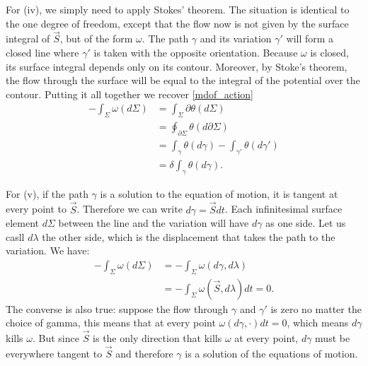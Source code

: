 \documentclass[10pt,twocolumn, nofootinbib]{revtex4-2}
\begin{document}
For (iv), we simply need to apply Stokes' theorem. The situation is identical to the one degree of freedom, except that the flow now is not given by the surface integral of $\vec{S}$, but of the form $\omega$. The path $\gamma$ and its variation $\gamma'$ will form a closed line where $\gamma'$ is taken with the opposite orientation. Because $\omega$ is closed, its surface integral depends only on its contour. Moreover, by Stoke's theorem, the flow through the surface will be equal to the integral of the potential over the contour. Putting it all together we recover \ref{mdof_action}
\begin{equation}
\begin{aligned}
	- \int_{\Sigma} \omega(d\Sigma) &=
	\int_{\Sigma} \partial \theta (d\Sigma) \\
	&= \oint_{\partial \Sigma} \theta(d\partial\Sigma) \\
	&= \int_{\gamma} \theta(d\gamma) - \int_{\gamma'} \theta (d\gamma') \\
	&= \delta \int_{\gamma} \theta (d\gamma).
\end{aligned}
\end{equation}

For (v), if the path $\gamma$ is a solution to the equation of motion, it is tangent at every point to $\vec{S}$. Therefore we can write $d\gamma= \vec{S} dt$. Each infinitesimal surface element $d\Sigma$ between the line and the variation will have $d\gamma$ as one side. Let us casll $d\lambda$ the other side, which is the displacement that takes the path to the variation. We have:
\begin{equation}
\begin{aligned}
	-\int_\Sigma \omega(d\Sigma) &= -\int_\Sigma \omega(d\gamma, d\lambda) \\
	&= -\int_\Sigma \omega(\vec{S}, d\lambda) dt = 0.
\end{aligned}
\end{equation}
The converse is also true: suppose the flow through $\gamma$ and $\gamma'$ is zero no matter the choice of gamma, this means that at every point $\omega(d\gamma, \cdot) dt = 0$, which means $d\gamma$ kills $\omega$. But since $\vec{S}$ is the only direction that kills $\omega$ at every point, $d\gamma$ must be everywhere tangent to $\vec{S}$ and therefore $\gamma$ is a solution of the equations of motion.
\end{document}
